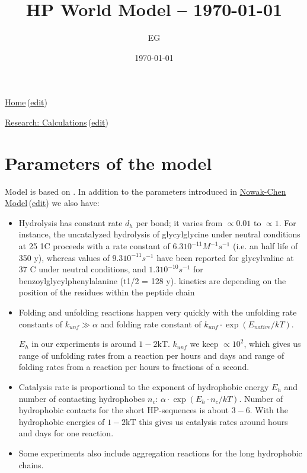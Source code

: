 \documentclass[12pt]{paper}
\title{HP World Model -- \today}
\author{EG}
\date{\today}
\newcommand{\ga}{\alpha}
\newcommand{\red}[1]{\textcolor{red}{#1}}
\newcommand{\wikilink}[2] { \href{#1.pdf}{#2}\,(\href{#1.tex}{edit})}
\begin{document}
 \maketitle
\wikilink{home}{Home}

\wikilink{research\_calculations}{Research: Calculations}

\tableofcontents
\section{Parameters of the model}
Model is based on \cite{nowak2008prevolutionary,Ohtsuki2009,Chen2012}.
In addition to the parameters introduced in \wikilink{nowak-chen}{Nowak-Chen Model} we also have:
\begin{itemize}
\item Hydrolysis has constant rate $d_h$ per bond; it varies from $\propto 0.01$ to $\propto 1$. 
\subitem For instance, the
uncatalyzed hydrolysis of glycylglycine under neutral conditions
at 25 1C proceeds with a rate constant of $6.3  10^{-11} M^{-1} s^{-1}$
(i.e. an half life of 350 y), whereas values of $9.3 10^{-11} s^{-1}$
have been reported for glycylvaline at 37 C under neutral
conditions\cite{Smith1998}, and $1.3  10^{-10} s^{-1} $ for benzoylglycylphenylalanine
(t1/2 = 128 y)\cite{Bryant1996}.
\subitem kinetics are depending on the position of the residues within the peptide chain 
\cite{Danger2012}
\item Folding and unfolding reactions happen very quickly with the unfolding rate constants of 
$k_{unf}\gg\ga$ and folding rate constant of $k_{unf}\cdot\exp(E_{native}/kT)$.

$E_h$ in our experiments is around $1-2$kT\red{\cite{}}. $k_{unf}$ we keep $\propto 10^2$, which 
gives us range of unfolding rates from a reaction per hours and days and range of folding rates 
from a reaction per hours to fractions of a second.

\item Catalysis rate is proportional to the exponent of hydrophobic energy $E_h$ and number of 
contacting hydrophobes $n_c$: $\ga\cdot\exp(E_{h}\cdot n_{c}/kT)$. Number of hydrophobic contacts 
for the short HP-sequences is about $3-6$. With the hydrophobic energies of $1-2$kT this gives us 
catalysis rates around hours and days for one reaction.

\item Some experiments also include aggregation reactions for the long hydrophobic chains.
\end{itemize}
 






 
  
\end{document}
